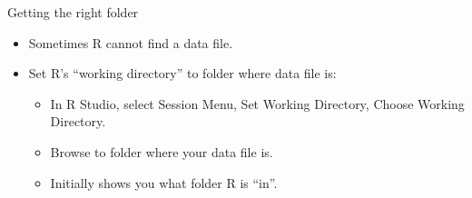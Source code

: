 \begin{frame}[fragile]{Getting the right folder}
  
  \begin{itemize}
  \item Sometimes R cannot find a data file.
  \item Set R's ``working directory'' to folder where data file is:
    \begin{itemize}
    \item In R Studio, select Session Menu, Set Working Directory,
      Choose Working Directory.
    \item Browse to folder where your data file is.
    \item Initially shows you what folder R is ``in''.
    \end{itemize}
  \end{itemize}
  
\end{frame}

